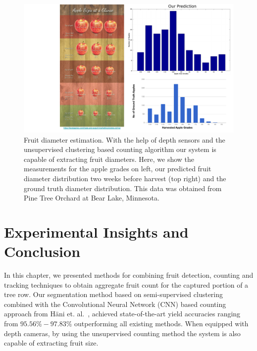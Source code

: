 \begin{figure}[!hbpt]

        \centering     
        
            \includegraphics[width =\textwidth]{figures/map_yield/AppleYieldEstimationOverview.pdf}         
        
  
   \caption[Fruit diameter estimation.]{Fruit diameter estimation. With the help of depth sensors and the unsupervised clustering based counting algorithm our system is capable of extracting fruit diameters. Here, we show the measurements for the apple grades on left, our predicted fruit diameter distribution two weeks before harvest (top right) and the ground truth diameter distribution. This data was obtained from Pine Tree Orchard at Bear Lake, Minnesota.}
    \label{fig:diam}
\end{figure} 
\section{Experimental Insights and Conclusion}\label{sec:track_conc}
In this chapter, we presented methods for combining fruit detection, counting and tracking techniques to obtain aggregate fruit count for the captured portion of a tree row. Our segmentation method based on semi-supervised clustering combined with the Convolutional Neural Network (CNN) based counting approach from H{\"a}ni et. al.~\cite{hani_jfr_counting}, achieved state-of-the-art yield accuracies ranging from $95.56\%-97.83\%$ outperforming all existing methods. When equipped with depth cameras, by using the unsupervised counting method the system is also capable of extracting fruit size.

